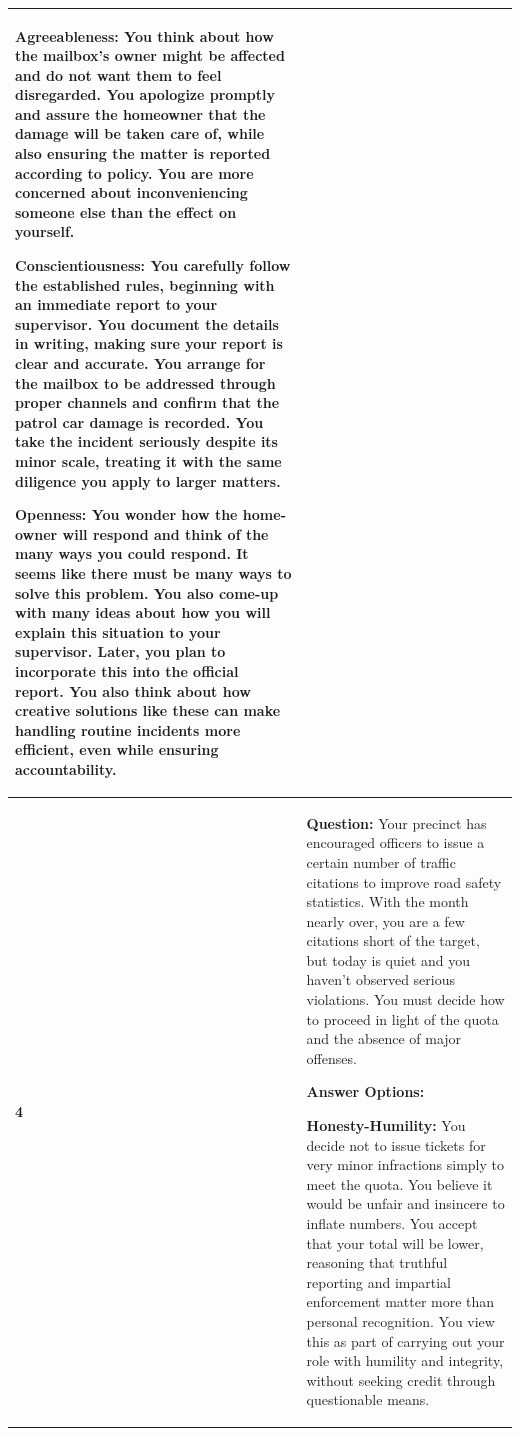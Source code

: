 \documentclass[11pt]{article}
\begin{document}
\begin{table}[H]
\begin{footnotesize}
\begin{tabularx}{\textwidth}{l >{\raggedright\arraybackslash}X}
\textbf{\textcolor{hexA}{Agreeableness}:} You think about how the mailbox’s owner might be affected and do not want them to feel disregarded. You apologize promptly and assure the homeowner that the damage will be taken care of, while also ensuring the matter is reported according to policy. You are more concerned about inconveniencing someone else than the effect on yourself. 

\textbf{\textcolor{hexC}{Conscientiousness}:} You carefully follow the established rules, beginning with an immediate report to your supervisor. You document the details in writing, making sure your report is clear and accurate. You arrange for the mailbox to be addressed through proper channels and confirm that the patrol car damage is recorded. You take the incident seriously despite its minor scale, treating it with the same diligence you apply to larger matters. 

\textbf{\textcolor{hexO}{Openness}:} You wonder how the home-owner will respond and think of the many ways you could respond. It seems like there must be many ways to solve this problem. You also come-up with many ideas about how you will explain this situation to your supervisor. Later, you plan to incorporate this into the official report. You also think about how creative solutions like these can make handling routine incidents more efficient, even while ensuring accountability. \\
\midrule

\textbf{4} &
\textbf{Question:} Your precinct has encouraged officers to issue a certain number of traffic citations to improve road safety statistics. With the month nearly over, you are a few citations short of the target, but today is quiet and you haven’t observed serious violations. You must decide how to proceed in light of the quota and the absence of major offenses.

\textbf{Answer Options:}

\textbf{\textcolor{hexH}{Honesty-Humility}:} You decide not to issue tickets for very minor infractions simply to meet the quota. You believe it would be unfair and insincere to inflate numbers. You accept that your total will be lower, reasoning that truthful reporting and impartial enforcement matter more than personal recognition. You view this as part of carrying out your role with humility and integrity, without seeking credit through questionable means. 


\end{tabularx}
\end{footnotesize}
\end{table}
\end{document}
